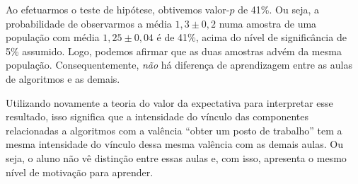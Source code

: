 Ao efetuarmos o teste de hipótese, obtivemos valor-$p$ de 41\%.
Ou seja, a probabilidade de observarmos a média $1,3 \pm 0,2$ numa amostra de uma população com média $1,25 \pm 0,04$ é de 41\%, acima do nível de significância de 5\% assumido.
Logo, podemos afirmar que as duas amostras advém da mesma população.
Consequentemente, \emph{não} há diferença de aprendizagem entre as aulas de algoritmos e as demais.

Utilizando novamente a teoria do valor da expectativa para interpretar esse resultado, isso significa que a intensidade do vínculo das componentes relacionadas a algoritmos com a valência ``obter um posto de trabalho'' tem a mesma intensidade do vínculo dessa mesma valência com as demais aulas.
Ou seja, o aluno não vê distinção entre essas aulas e, com isso, apresenta o mesmo nível de motivação para aprender.